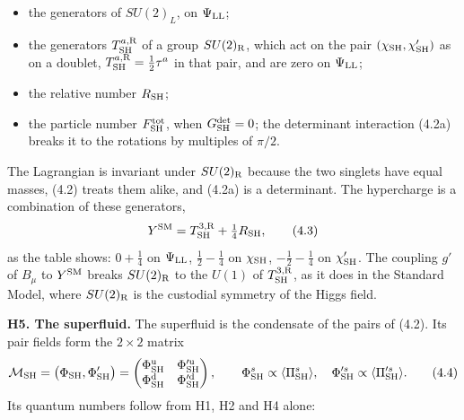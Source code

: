 \documentclass[
  10pt,
]{article}
\providecommand{\tightlist}{%
  \setlength{\itemsep}{0pt}\setlength{\parskip}{0pt}}
\begin{document}
\begin{itemize}
\tightlist
\item
  the generators of \(SU(2)_L\), on \(\Psi_{\rm LL}\);
\item
  the generators \(T^{a,{\rm R}}_{\rm SH}\) of a group
  \(SU(2)_{\rm R}\), which act on the pair
  \((\chi_{\rm SH},\chi'_{\rm SH})\) as on a doublet,
  \(T^{a,{\rm R}}_{\rm SH}=\tfrac12\tau^a\) in that pair, and are zero
  on \(\Psi_{\rm LL}\);
\item
  the relative number \(R_{\rm SH}\);
\item
  the particle number \(F^{\rm tot}_{\rm SH}\), when
  \(G^{\rm det}_{\rm SH}=0\); the determinant interaction (4.2a) breaks
  it to the rotations by multiples of \(\pi/2\).
\end{itemize}

The Lagrangian is invariant under \(SU(2)_{\rm R}\) because the two
singlets have equal masses, (4.2) treats them alike, and (4.2a) is a
determinant. The hypercharge is a combination of these generators,
\[Y^{\rm SM}=T^{3,{\rm R}}_{\rm SH}+\tfrac14R_{\rm SH},\tag{4.3}\] as
the table shows: \(0+\tfrac14\) on \(\Psi_{\rm LL}\),
\(\tfrac12-\tfrac14\) on \(\chi_{\rm SH}\), \(-\tfrac12-\tfrac14\) on
\(\chi'_{\rm SH}\). The coupling \(g'\) of \(B_\mu\) to \(Y^{\rm SM}\)
breaks \(SU(2)_{\rm R}\) to the \(U(1)\) of \(T^{3,{\rm R}}_{\rm SH}\),
as it does in the Standard Model, where \(SU(2)_{\rm R}\) is the
custodial symmetry of the Higgs field.

\textbf{H5. The superfluid.} The superfluid is the condensate of the
pairs of (4.2). Its pair fields form the \(2\times2\) matrix
\[\mathcal M_{\rm SH}=\big(\Phi_{\rm SH},\Phi'_{\rm SH}\big)=\begin{pmatrix}\Phi^{\rm u}_{\rm SH}&\Phi'^{\rm u}_{\rm SH}\\\Phi^{\rm d}_{\rm SH}&\Phi'^{\rm d}_{\rm SH}\end{pmatrix},\qquad
\Phi^s_{\rm SH}\propto\langle\Pi^s_{\rm SH}\rangle,\quad\Phi'^s_{\rm SH}\propto\langle\Pi'^s_{\rm SH}\rangle.\tag{4.4}\]
Its quantum numbers follow from H1, H2 and H4 alone:
\end{document}
